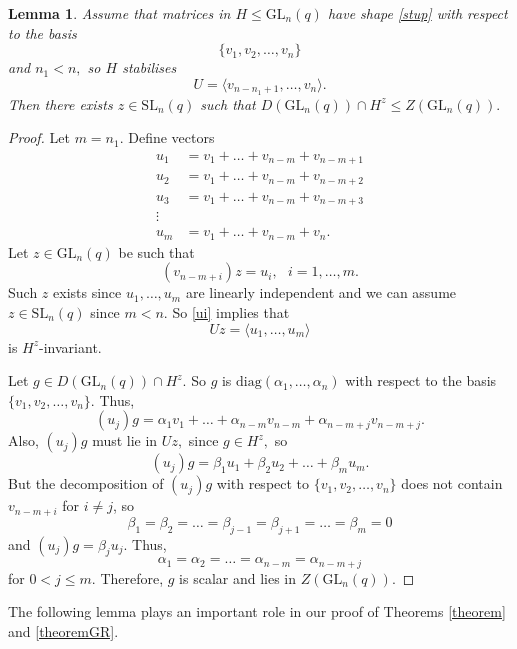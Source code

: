 \documentclass[a4paper,reqno,11pt]{amsart}
\newtheorem{Lem}[Th]{Lemma}
\theoremstyle{definition}
\theoremstyle{remark}
\numberwithin{equation}{section}
\newcommand{\SL}{{\mathrm{SL}}}
\newcommand{\GL}{{\mathrm{GL}}}
\begin{document}
\begin{Lem}\label{diag}
Assume that matrices in $H\le \GL_n(q)$ have shape \eqref{stup} with respect to the  basis $$\{v_1, v_2, \ldots,  v_n \}$$ and $n_1 < n,$ so $H$ stabilises $$U=\langle v_{n-n_1+1}, \ldots, v_n \rangle.$$  Then there exists $z \in \SL_n(q)$ such that $D(\GL_n(q)) \cap H^z \le Z(\GL_n(q)).$
\end{Lem} 
\begin{proof}
Let $m=n_1.$ Define vectors 
\begin{equation*}
\begin{split}
u_1 & = v_1 + \ldots + v_{n-m} + v_{n-m+1}  \\
u_2 & = v_1 + \ldots + v_{n-m} + v_{n-m +2}\\
u_3 & = v_1 + \ldots + v_{n-m}  + v_{n-m +3}\\
\vdots \\
u_m & = v_1 + \ldots + v_{n-m} + v_{n}.
\end{split}
\end{equation*}
Let $z \in \GL_n(q)$ be such that 
\begin{equation}\label{ui}
(v_{n-m+i})z=u_i, \text{ } i=1, \ldots, m.
\end{equation}
 Such  $z$ exists since $u_1, \ldots, u_m$ are linearly independent and we can assume $z\in \SL_n(q)$ since $m<n.$ So \eqref{ui} implies that 
$$Uz = \langle u_1, \ldots, u_m \rangle $$ is $H^z$-invariant.

Let $g \in D(\GL_n(q)) \cap H^z.$ So $g$ is $\text{diag}(\alpha_1, \ldots , \alpha_n)$ with respect to the basis $\{v_1, v_2, \ldots, v_{n}\}$. Thus,
$$(u_j)g = \alpha_1 v_1 + \ldots + \alpha_{n-m} v_{n-m} + \alpha_{n-m+j} v_{n-m+j}. $$
Also, $(u_j)g$ must lie in $Uz,$ since $g \in H^z,$ so 
$$(u_j)g = \beta_1 u_1 + \beta_2 u_2 + \ldots + \beta_m u_m.$$
But the decomposition of $(u_j)g$ with respect to    $\{v_1, v_2, \ldots, v_{n}\}$ does not contain $v_{n-m +i}$ for $i \ne j$, so 
$$\beta_1 = \beta_2 = \ldots =\beta_{j-1} =\beta_{j+1}= \ldots = \beta_m =0$$ and $(u_j)g= \beta_j u_j$. Thus, 
$$\alpha_1 = \alpha_2 = \ldots =  \alpha_{n-m}=\alpha_{n-m+j}$$
for $0<j\le m.$
Therefore, $g$ is scalar and lies in $Z(\GL_n(q)).$
\end{proof}

The following lemma plays an important role in our proof of Theorems \ref{theorem} and \ref{theoremGR}. 
\end{document}
